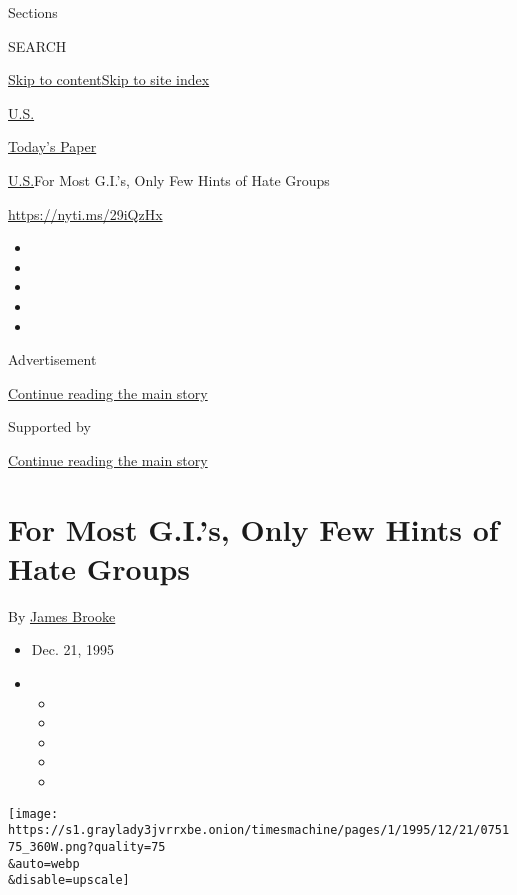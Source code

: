 Sections

SEARCH

\protect\hyperlink{site-content}{Skip to
content}\protect\hyperlink{site-index}{Skip to site index}

\href{https://www.nytimes3xbfgragh.onion/section/us}{U.S.}

\href{https://myaccount.nytimes3xbfgragh.onion/auth/login?response_type=cookie\&client_id=vi}{}

\href{https://www.nytimes3xbfgragh.onion/section/todayspaper}{Today's
Paper}

\href{/section/us}{U.S.}\textbar{}For Most G.I.'s, Only Few Hints of
Hate Groups

\url{https://nyti.ms/29iQzHx}

\begin{itemize}
\item
\item
\item
\item
\item
\end{itemize}

Advertisement

\protect\hyperlink{after-top}{Continue reading the main story}

Supported by

\protect\hyperlink{after-sponsor}{Continue reading the main story}

\hypertarget{for-most-gis-only-few-hints-of-hate-groups}{%
\section{For Most G.I.'s, Only Few Hints of Hate
Groups}\label{for-most-gis-only-few-hints-of-hate-groups}}

By \href{https://www.nytimes3xbfgragh.onion/by/james-brooke}{James
Brooke}

\begin{itemize}
\item
  Dec. 21, 1995
\item
  \begin{itemize}
  \item
  \item
  \item
  \item
  \item
  \end{itemize}
\end{itemize}

\texttt{[image: https://s1.graylady3jvrrxbe.onion/timesmachine/pages/1/1995/12/21/075175\_360W.png?quality=75\\\&auto=webp\\\&disable=upscale]}

